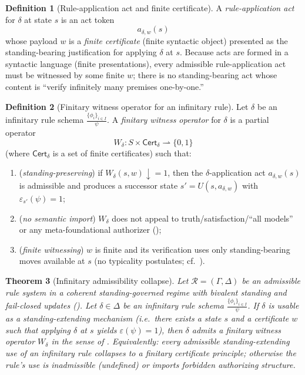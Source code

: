 \documentclass[11pt]{article}
\newtheorem{theorem}{Theorem}[section]
\theoremstyle{definition}
\newtheorem{definition}[theorem]{Definition}
\begin{document}
\begin{definition}[Rule-application act and finite certificate]
\label{def:rule-application-act}
A \emph{rule-application act} for $\delta$ at state $s$ is an act token
\[
 a_{\delta,w}(s)
\]
whose payload $w$ is a \emph{finite certificate} (finite syntactic object) presented as the
standing-bearing justification for applying $\delta$ at $s$.
Because acts are formed in a syntactic language (finite presentations), every admissible
rule-application act must be witnessed by some finite $w$; there is no standing-bearing act whose
content is ``verify infinitely many premises one-by-one.''
\end{definition}

\begin{definition}[Finitary witness operator for an infinitary rule]
\label{def:finitary-witness}
Let $\delta$ be an infinitary rule schema $\frac{\{\phi_i\}_{i\in I}}{\psi}$.
A \emph{finitary witness operator} for $\delta$ is a partial operator
\[
 W_\delta : S\times \mathsf{Cert}_\delta \rightharpoonup \{0,1\}
\]
(where $\mathsf{Cert}_\delta$ is a set of finite certificates) such that:
\begin{enumerate}[label=(\roman*), leftmargin=2.2em]
\item (\emph{standing-preserving}) if $W_\delta(s,w)\downarrow=1$, then the $\delta$-application act
$a_{\delta,w}(s)$ is admissible and produces a successor state $s' = U(s,a_{\delta,w})$ with
$\varepsilon_{s'}(\psi)=1$;
\item (\emph{no semantic import}) $W_\delta$ does not appeal to truth/satisfaction/``all models'' or
any meta-foundational authorizer ();
\item (\emph{finite witnessing}) $w$ is finite and its verification uses only standing-bearing moves
available at $s$ (no typicality postulates; cf.\ ).
\end{enumerate}
\end{definition}

\begin{theorem}[Infinitary admissibility collapse]
\label{thm:infinitary-collapse}
Let $\mathcal R=(\Gamma,\Delta)$ be an admissible rule system in a coherent standing-governed
regime with bivalent standing and fail-closed updates
().
Let $\delta\in\Delta$ be an infinitary rule schema $\frac{\{\phi_i\}_{i\in I}}{\psi}$.
If $\delta$ is usable as a \emph{standing-extending} mechanism (i.e.\ there exists a state $s$ and a
certificate $w$ such that applying $\delta$ at $s$ yields $\varepsilon(\psi)=1$), then $\delta$
admits a finitary witness operator $W_\delta$ in the sense of .
Equivalently: every admissible standing-extending use of an infinitary rule collapses to a
finitary certificate principle; otherwise the rule’s use is inadmissible (undefined) or imports
forbidden authorizing structure.
\end{theorem}
\end{document}
